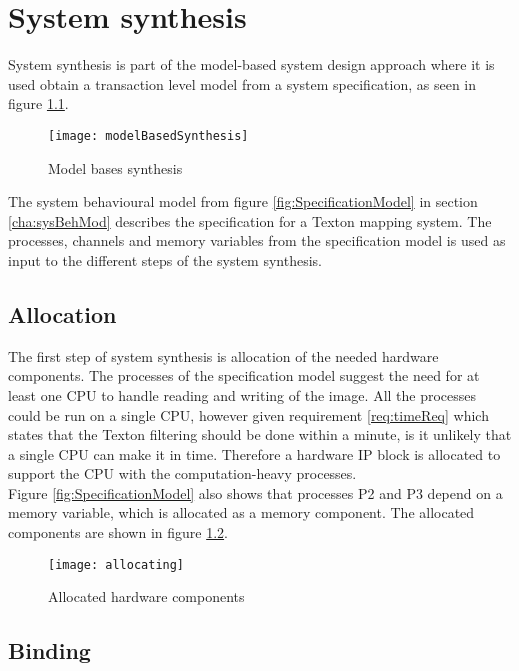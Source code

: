 \chapter{System synthesis}
System synthesis is part of the model-based system design approach where it is used obtain a transaction level model from a system specification, as seen in figure \ref{fig:modelBasedSyn}. 

\begin{figure}[H]
\centering
\texttt{[image: modelBasedSynthesis]}
\caption{Model bases synthesis}
\label{fig:modelBasedSyn}
\end{figure}

The system behavioural model from figure \ref{fig:SpecificationModel} in section \ref{cha:sysBehMod} describes the specification for a Texton mapping system. 
The processes, channels and memory variables from the specification model is used as input to the different steps of the system synthesis.  

\section{Allocation}
The first step of system synthesis is allocation of the needed hardware components. 
The processes of the specification model suggest the need for at least one CPU to handle reading and writing of the image. 
All the processes could be run on a single CPU, however given requirement \ref{req:timeReq} which states that the Texton filtering should be done within a minute, is it unlikely that a single CPU can make it in time. 
Therefore a hardware IP block is allocated to support the CPU with the computation-heavy processes.
\\Figure \ref{fig:SpecificationModel} also shows that processes P2 and P3 depend on a memory variable, which is allocated as a memory component. The allocated components are shown in figure \ref{fig:allocHardComps}.

\begin{figure}[H]
\centering
\texttt{[image: allocating]}
\caption{Allocated hardware components}
\label{fig:allocHardComps}
\end{figure}




\section{Binding}

